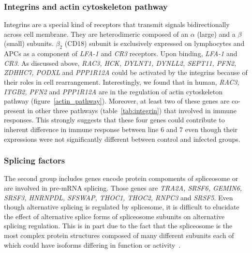 \documentclass[10pt]{article}
\begin{document}
\subsubsection*{Integrins and actin cytoskeleton pathway}

Integrins are a special kind of receptors that transmit signals bidirectionally across cell membrane.
They are heterodimeric composed of an $\alpha$ (large) and a $\beta$ (small) subunits.
$\beta_{2}$ (CD18) subunit is exclusively expressed on lymphocytes and APCs as a component of \textit{LFA-1}
and \textit{CR3} receptors.
Upon binding, \textit{LFA-1} and \textit{CR3}.
As discussed above, \textit{RAC3, HCK, DYLNT1, DYNLL2, SEPT11, PFN2, ZDHHC7, PODXL} and \textit{PPP1R12A}
could be activated by the integrins because of their roles in cell rearrangement.
Interestingly, we found that in human, \textit{RAC3, ITGB2, PFN2} and \textit{PPP1R12A} are in the regulation
of actin cytoskeleton pathway (figure~\ref{actin_pathway}).
Moreover, at least two of these genes are co-present in other three pathways (table~\ref{tab:integrin}) that
involved in immune responses.
This strongly suggests that these four genes could contribute to inherent difference in immune response between
line 6 and 7 even though their expressions were not significantly different between control and infected groups.

\subsubsection*{Splicing factors}

The second group includes genes encode protein compoments of spliceosome or are involved in pre-mRNA splicing.
Those genes are \textit{TRA2A, SRSF6, GEMIN6, SRSF3, HNRNPDL, SFSWAP, THOC1, THOC2, RNPC3} and \textit{SRSF5}.
Even though alternative splicing is regulated by splicesome, it is difficult to elucidate the effect of alternative
splice forms of spliceosome subunits on alternative splicing regulation.
This is in part due to the fact that the spliceosome is the most complex protein structures composed of many different
subunits each of which could have isoforms differing in function or activity~\cite{}.
\end{document}
